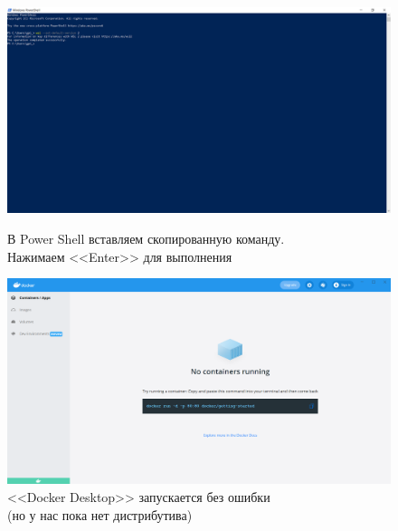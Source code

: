 \begin{figure}[!p]
    \centering
    \begin{minipage}{0.47\textwidth}
        \centering
        \includegraphics[width=\linewidth]
            {_assets/gpi_pz_docker_13.png}
        \caption{В Power Shell вставляем скопированную команду. \\ Нажимаем <<Enter>> для выполнения}
        \label{fig:gpi_pz_docker_13}
    \end{minipage}
    \begin{minipage}{0.47\textwidth}
        \centering
        \includegraphics[width=\linewidth]
            {_assets/gpi_pz_docker_14.png}
        \caption{<<Docker Desktop>> запускается без ошибки \\ (но у нас пока нет дистрибутива)}
        \label{fig:gpi_pz_docker_14}
    \end{minipage}
\end{figure}

